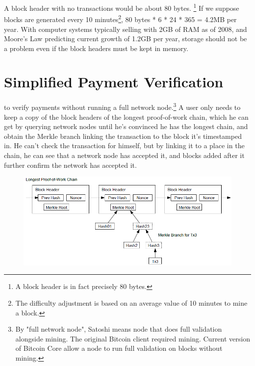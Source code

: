\documentclass[nohyper]{tufte-handout}
\begin{document}
A block header with no transactions would be about 80 bytes.  \footnote{A block header is in fact precisely 80 bytes.} If we
suppose blocks are generated every 10 minutes\footnote{The difficulty adjustment is based on an average value of 10 minutes to mine a block.}, 80 bytes * 6 * 24 * 365 =
4.2MB per year. With computer systems typically selling with 2GB of RAM
as of 2008, and Moore's Law predicting current growth of 1.2GB per year,
storage should not be a problem even if the block headers must be kept
in memory.


\section{Simplified Payment
Verification}\label{simplified-payment-verification}

 to verify payments without running a full network node.\footnote{By "full network node", Satoshi means node that does full validation alongside mining.  The original Bitcoin client required mining.  Current version of Bitcoin Core allow a node to run full validation on blocks without mining.} A user only needs to keep a copy of the block headers of the longest
proof-of-work chain, which he can get by querying network nodes until
he's convinced he has the longest chain, and obtain the Merkle branch
linking the transaction to the block it's timestamped in. He can't check
the transaction for himself, but by linking it to a place in the chain,
he can see that a network node has accepted it, and blocks added after
it further confirm the network has accepted it.

\begin{figure}[!h]
\centering
\includegraphics[width=\linewidth]{spv.png}

\end{figure}
\end{document}
